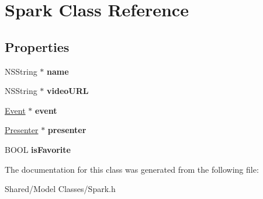 \hypertarget{interface_spark}{
\section{Spark Class Reference}
\label{interface_spark}
}
\subsection*{Properties}
\begin{DoxyCompactItemize}
\item 
\hypertarget{interface_spark_a6f64ee7dafec9747dda5e8d58844c95b}{
NSString $\ast$ {\bfseries name}}
\label{interface_spark_a6f64ee7dafec9747dda5e8d58844c95b}

\item 
\hypertarget{interface_spark_a28591b74e4de3b11a01de04e70950e17}{
NSString $\ast$ {\bfseries videoURL}}
\label{interface_spark_a28591b74e4de3b11a01de04e70950e17}

\item 
\hypertarget{interface_spark_aebc2728eb4980f490d641dd927e83c5a}{
\hyperlink{interface_event}{Event} $\ast$ {\bfseries event}}
\label{interface_spark_aebc2728eb4980f490d641dd927e83c5a}

\item 
\hypertarget{interface_spark_a634f056755278f0a701327749ea4aa40}{
\hyperlink{interface_presenter}{Presenter} $\ast$ {\bfseries presenter}}
\label{interface_spark_a634f056755278f0a701327749ea4aa40}

\item 
\hypertarget{interface_spark_a3a335e5160d283c46cc40f8112b201a8}{
BOOL {\bfseries isFavorite}}
\label{interface_spark_a3a335e5160d283c46cc40f8112b201a8}

\end{DoxyCompactItemize}


The documentation for this class was generated from the following file:\begin{DoxyCompactItemize}
\item 
Shared/Model Classes/Spark.h\end{DoxyCompactItemize}
